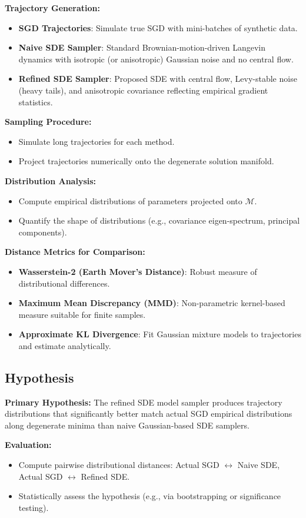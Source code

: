 \documentclass[11pt]{article}
\begin{document}
\textbf{Trajectory Generation:}
\begin{itemize}
\item \textbf{SGD Trajectories}: Simulate true SGD with mini-batches of synthetic data.
\item \textbf{Naive SDE Sampler}: Standard Brownian-motion-driven Langevin dynamics with isotropic (or anisotropic) Gaussian noise and no central flow.
\item \textbf{Refined SDE Sampler}: Proposed SDE with central flow, Levy-stable noise (heavy tails), and anisotropic covariance reflecting empirical gradient statistics.
\end{itemize}

\textbf{Sampling Procedure:}
\begin{itemize}
\item Simulate long trajectories for each method.
\item Project trajectories numerically onto the degenerate solution manifold.
\end{itemize}

\textbf{Distribution Analysis:}
\begin{itemize}
\item Compute empirical distributions of parameters projected onto $\mathcal{M}$.
\item Quantify the shape of distributions (e.g., covariance eigen-spectrum, principal components).
\end{itemize}

\textbf{Distance Metrics for Comparison:}
\begin{itemize}
\item \textbf{Wasserstein-2 (Earth Mover’s Distance)}: Robust measure of distributional differences.
\item \textbf{Maximum Mean Discrepancy (MMD)}: Non-parametric kernel-based measure suitable for finite samples.
\item \textbf{Approximate KL Divergence}: Fit Gaussian mixture models to trajectories and estimate analytically.
\end{itemize}

\subsection{Hypothesis}

\textbf{Primary Hypothesis:} The refined SDE model sampler produces trajectory distributions that significantly better match actual SGD empirical distributions along degenerate minima than naive Gaussian-based SDE samplers.

\textbf{Evaluation:}
\begin{itemize}
\item Compute pairwise distributional distances: Actual SGD $\leftrightarrow$ Naive SDE, Actual SGD $\leftrightarrow$ Refined SDE.
\item Statistically assess the hypothesis (e.g., via bootstrapping or significance testing).
\end{itemize}
\end{document}
